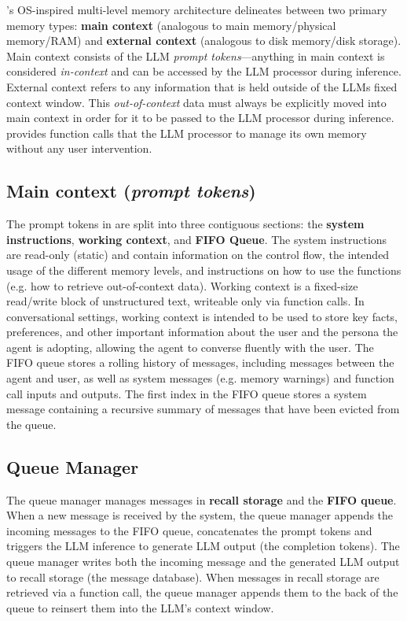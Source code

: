 \ours's OS-inspired multi-level memory architecture delineates between two primary memory types: \textbf{main context} (analogous to main memory/physical memory/RAM) and \textbf{external context} (analogous to disk memory/disk storage). 
Main context consists of the LLM \emph{prompt tokens}---anything in main context is considered \emph{in-context} and can be accessed by the LLM processor during inference.
External context refers to any information that is held outside of the LLMs fixed context window.
This \emph{out-of-context} data must always be explicitly moved into main context in order for it to be passed to the LLM processor during inference.
\ours provides function calls that the LLM processor to manage its own memory without any user intervention.

\subsection{Main context (\emph{prompt tokens})}

The prompt tokens in \ours are split into three contiguous sections: the \textbf{system instructions}, \textbf{working context}, and \textbf{FIFO Queue}. The system instructions are read-only (static) and contain information on the \ours control flow, the intended usage of the different memory levels, and instructions on how to use the \ours functions (e.g. how to retrieve out-of-context data). Working context is a fixed-size read/write block of unstructured text, writeable only via \ours function calls. In conversational settings, working context is intended to be used to store key facts, preferences, and other important information about the user and the persona the agent is adopting, allowing the agent to converse fluently with the user.
The FIFO queue stores a rolling history of messages, including messages between the agent and user, as well as system messages (e.g. memory warnings) and function call inputs and outputs. The first index in the FIFO queue stores a system message containing a recursive summary of messages that have been evicted from the queue.

\subsection{Queue Manager}

The queue manager manages messages in \textbf{recall storage} and the \textbf{FIFO queue}. When a new message is received by the system, the queue manager appends the incoming messages to the FIFO queue, concatenates the prompt tokens and triggers the LLM inference to generate LLM output (the completion tokens). The queue manager writes both the incoming message and the generated LLM output to recall storage (the \ours message database). When messages in recall storage are retrieved via a \ours function call, the queue manager appends them to the back of the queue to reinsert them into the LLM's context window.

